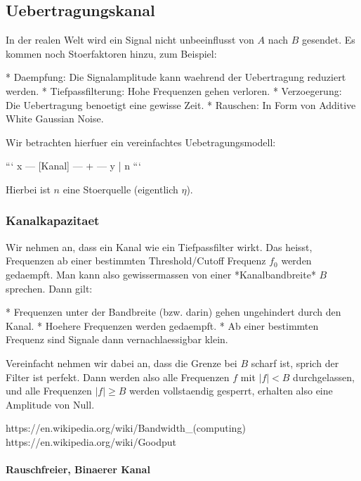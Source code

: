 \subsection{ Uebertragungskanal}

In der realen Welt wird ein Signal nicht unbeeinflusst von $A$ nach $B$
gesendet. Es kommen noch Stoerfaktoren hinzu, zum Beispiel:

* Daempfung: Die Signalamplitude kann waehrend der Uebertragung reduziert
  werden.
* Tiefpassfilterung: Hohe Frequenzen gehen verloren.
* Verzoegerung: Die Uebertragung benoetigt eine gewisse Zeit.
* Rauschen: In Form von Additive White Gaussian Noise.

Wir betrachten hierfuer ein vereinfachtes Uebetragungsmodell:

``` x --- [Kanal] --- + --- y | n ```

Hierbei ist $n$ eine Stoerquelle (eigentlich $\eta$).

\subsubsection{ Kanalkapazitaet}

Wir nehmen an, dass ein Kanal wie ein Tiefpassfilter wirkt. Das heisst,
Frequenzen ab einer bestimmten Threshold/Cutoff Frequenz $f_0$ werden
gedaempft. Man kann also gewissermassen von einer *Kanalbandbreite* $B$
sprechen. Dann gilt:

* Frequenzen unter der Bandbreite (bzw. darin) gehen ungehindert durch den
  Kanal.
* Hoehere Frequenzen werden gedaempft.
* Ab einer bestimmten Frequenz sind Signale dann vernachlaessigbar klein.

Vereinfacht nehmen wir dabei an, dass die Grenze bei $B$ scharf ist, sprich der
Filter ist perfekt. Dann werden also alle Frequenzen $f$ mit $|f| < B$
durchgelassen, und alle Frequenzen $|f| \geq B$ werden vollstaendig gesperrt,
erhalten also eine Amplitude von Null.

https://en.wikipedia.org/wiki/Bandwidth\_(computing)
https://en.wikipedia.org/wiki/Goodput

\paragraph{ Rauschfreier, Binaerer Kanal}

